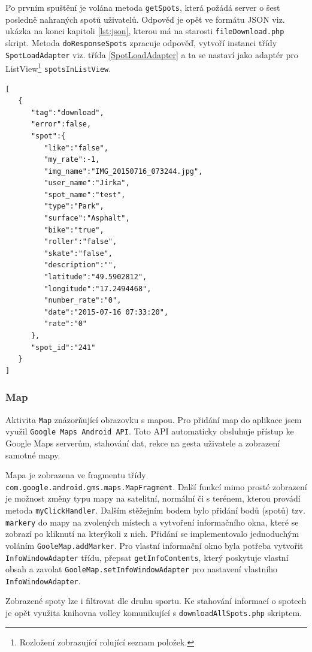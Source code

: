 \documentclass[12pt]{article}
\begin{document}
Po prvním spuštění je volána metoda \verb+getSpots+, která požádá server o šest posledně nahraných spotů uživatelů. Odpověď je opět ve formátu JSON viz. ukázka na konci kapitoli \ref{lst:json}, kterou má na starosti \verb+fileDownload.php+ skript. Metoda \verb+doResponseSpots+ zpracuje odpověď, vytvoří instanci třídy \verb+SpotLoadAdapter+ viz. třída \ref{SpotLoadAdapter} a ta se nastaví jako adaptér pro ListView\footnote[11]{Rozložení zobrazující rolující seznam položek.} \verb+spotsInListView+.
\begin{lstlisting}[title=Ukázka odpovědi PHP skriptu fileDownload.php,
label={lst:json}]
[
   {
      "tag":"download",
      "error":false,
      "spot":{
         "like":"false",
         "my_rate":-1,
         "img_name":"IMG_20150716_073244.jpg",
         "user_name":"Jirka",
         "spot_name":"test",
         "type":"Park",
         "surface":"Asphalt",
         "bike":"true",
         "roller":"false",
         "skate":"false",
         "description":"",
         "latitude":"49.5902812",
         "longitude":"17.2494468",
         "number_rate":"0",
         "date":"2015-07-16 07:33:20",
         "rate":"0"
      },
      "spot_id":"241"
   }
]
\end{lstlisting}
\subsubsection{Map}
\label{map}
Aktivita \verb+Map+ znázorňující obrazovku s mapou. Pro přidání map do aplikace jsem využil \verb+Google Maps Android API+. Toto API automaticky obsluhuje přístup ke Google Maps serverům, stahování dat, rekce na gesta uživatele a zobrazení samotné mapy.\cite{maps}

Mapa je zobrazena ve fragmentu třídy \verb+com.google.android.gms.maps.MapFragment+. Další funkcí mimo prosté zobrazení je možnost změny typu mapy na satelitní, normální či s terénem, kterou provádí metoda \verb+myClickHandler+. Dalším stěžejním bodem bylo přidání bodů (spotů) tzv. \verb+markery+ do mapy na zvolených místech a vytvoření informačního okna, které se zobrazí po kliknutí na kterýkoli z nich.
Přidání se implementovalo jednoduchým voláním \verb+GooleMap.addMarker+. Pro vlastní informační okno byla potřeba vytvořit \verb+InfoWindowAdapter+ třídu, přepsat \verb+getInfoContents+, který poskytuje vlastní obsah a zavolat \verb+GooleMap.setInfoWindowAdapter+ pro nastavení vlastního \verb+InfoWindowAdapter+.

Zobrazené spoty lze i filtrovat dle druhu sportu. Ke stahování informací o spotech je opět využita knihovna volley komunikující s \verb+downloadAllSpots.php+ skriptem.
\end{document}
